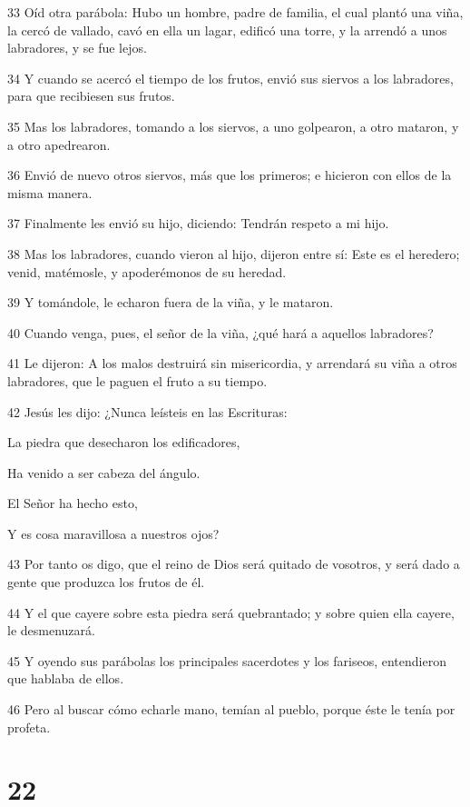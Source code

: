 \par 33 Oíd otra parábola: Hubo un hombre, padre de familia, el cual plantó una viña, la cercó de vallado, cavó en ella un lagar, edificó una torre, y la arrendó a unos labradores, y se fue lejos.
\par 34 Y cuando se acercó el tiempo de los frutos, envió sus siervos a los labradores, para que recibiesen sus frutos.
\par 35 Mas los labradores, tomando a los siervos, a uno golpearon, a otro mataron, y a otro apedrearon.
\par 36 Envió de nuevo otros siervos, más que los primeros; e hicieron con ellos de la misma manera.
\par 37 Finalmente les envió su hijo, diciendo: Tendrán respeto a mi hijo.
\par 38 Mas los labradores, cuando vieron al hijo, dijeron entre sí: Este es el heredero; venid, matémosle, y apoderémonos de su heredad.
\par 39 Y tomándole, le echaron fuera de la viña, y le mataron.
\par 40 Cuando venga, pues, el señor de la viña, ¿qué hará a aquellos labradores?
\par 41 Le dijeron: A los malos destruirá sin misericordia, y arrendará su viña a otros labradores, que le paguen el fruto a su tiempo.
\par 42 Jesús les dijo: ¿Nunca leísteis en las Escrituras:
\par La piedra que desecharon los edificadores,
\par Ha venido a ser cabeza del ángulo.
\par El Señor ha hecho esto,
\par Y es cosa maravillosa a nuestros ojos?
\par 43 Por tanto os digo, que el reino de Dios será quitado de vosotros, y será dado a gente que produzca los frutos de él.
\par 44 Y el que cayere sobre esta piedra será quebrantado; y sobre quien ella cayere, le desmenuzará.
\par 45 Y oyendo sus parábolas los principales sacerdotes y los fariseos, entendieron que hablaba de ellos.
\par 46 Pero al buscar cómo echarle mano, temían al pueblo, porque éste le tenía por profeta.

\chapter{22}

